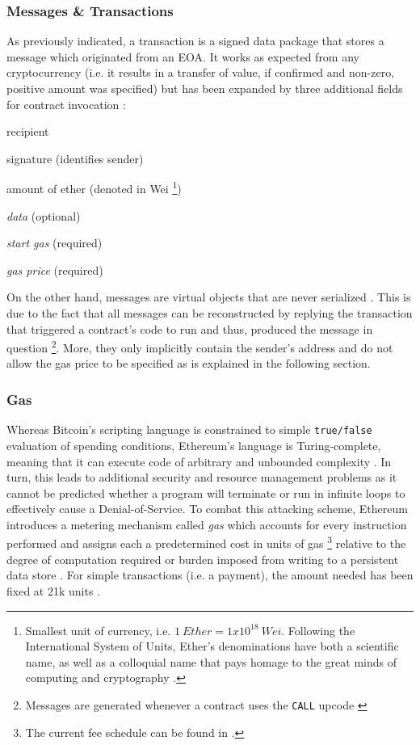 \subsubsection{Messages \& Transactions}
\label{sec:messagesTransactions}
As previously indicated, a transaction is a signed data package that stores a message which originated from an \ac{EOA}. It works as expected from any cryptocurrency (i.e. it results in a transfer of value, if confirmed and non-zero, positive amount was specified) but has been expanded by three additional fields for contract invocation \cite[p.~18]{ethereumWhitepaperGitHub}: 

\begin{AutoMultiColItemize}
  \item recipient
  \item signature (identifies sender)
  \item amount of ether (denoted in Wei \footnote{Smallest unit of currency, i.e. $1\ Ether = 1x10^{18}\ Wei$. Following the International System of Units, Ether's denominations have both a scientific name, as well as a colloquial name that pays homage to the great minds of computing and cryptography \cite[p.~40]{Antonopoulos.2018}.})
  \item \textit{data} (optional)
  \item \textit{start gas} (required)
  \item \textit{gas price} (required)
\end{AutoMultiColItemize}

On the other hand, messages are virtual objects that are never serialized \cite[p.~19]{ethereumWhitepaperGitHub}. This is due to the fact that all messages can be reconstructed by replying the transaction that triggered a contract's code to run and thus, produced the message in question \footnote{Messages are generated whenever a contract uses the \texttt{CALL} upcode \cite[p.~19]{ethereumWhitepaperGitHub}}. More, they only implicitly contain the sender's address and do not allow the gas price to be specified as is explained in the following section.

\subsubsection{Gas}
Whereas Bitcoin's scripting language is constrained to simple \texttt{true/false} evaluation of spending conditions, Ethereum's language is Turing-complete, meaning that it can execute code of arbitrary and unbounded complexity \cite[p.~25]{Antonopoulos.2018}. In turn, this leads to additional security and resource management problems as it cannot be predicted whether a program will terminate or run in infinite loops to effectively cause a Denial-of-Service. To combat this attacking scheme, Ethereum introduces a metering mechanism called \textit{gas} which accounts for every instruction performed and assigns each a predetermined cost in units of gas \footnote{The current fee schedule can be found in \cite[p.~25]{ethereumYellowPaper}.} relative to the degree of computation required or burden imposed from writing to a persistent data store \cite[pp.~32-33]{Antonopoulos.2018}. For simple transactions (i.e. a payment), the amount needed has been fixed at 21k units \cite[p.~153]{Antonopoulos.2018}. 

